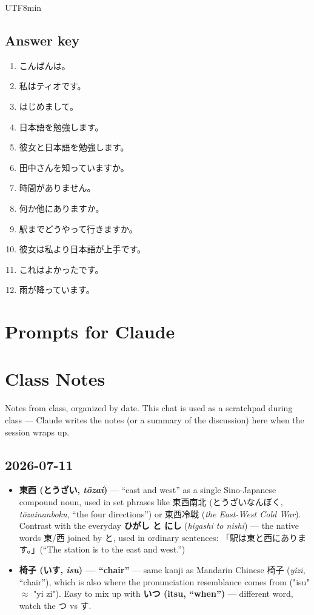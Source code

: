 \documentclass[11pt]{article}
\begin{document}
\begin{CJK}{UTF8}{min}
\subsection{Answer key}
\begin{enumerate}
  \item こんばんは。
  \item 私はティオです。
  \item はじめまして。
  \item 日本語を勉強します。
  \item 彼女と日本語を勉強します。
  \item 田中さんを知っていますか。
  \item 時間がありません。
  \item 何か他にありますか。
  \item 駅までどうやって行きますか。
  \item 彼女は私より日本語が上手です。
  \item これはよかったです。
  \item 雨が降っています。
\end{enumerate}



\section{Prompts for Claude}


\section{Class Notes}
Notes from class, organized by date. This chat is used as a scratchpad during
class --- Claude writes the notes (or a summary of the discussion) here when
the session wraps up.

\subsection{2026-07-11}
\begin{itemize}
  \item \textbf{東西 (とうざい, \emph{tōzai})} --- ``east and west'' as a
        single Sino-Japanese compound noun, used in set phrases like
        東西南北 (とうざいなんぼく, \emph{tōzainanboku}, ``the four
        directions'') or 東西冷戦 (\emph{the East-West Cold War}). Contrast
        with the everyday \textbf{ひがし と にし} (\emph{higashi to nishi})
        --- the native words 東/西 joined by と, used in ordinary sentences:
        「駅は東と西にあります。」(``The station is to the east and west.'')
  \item \textbf{椅子 (いす, \emph{isu}) --- ``chair''} --- same kanji as
        Mandarin Chinese 椅子 (\emph{yǐzi}, ``chair''), which is also where
        the pronunciation resemblance comes from ("isu" $\approx$ "yi zi").
        Easy to mix up with \textbf{いつ (itsu, ``when'')} --- different
        word, watch the つ vs す.
\end{itemize}


\end{CJK}
\end{document}
